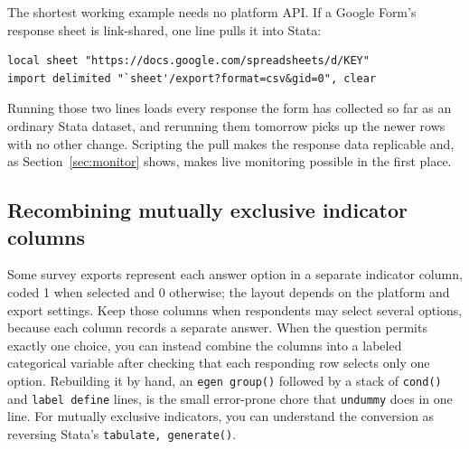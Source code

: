 \documentclass[
    a4paper,
    fontsize=10pt,
    twoside=true,
    numbers=noenddot,
]{kaobook}
\begin{document}
The shortest working example needs no platform API. If a Google Form's response sheet is link-shared, one line pulls it into Stata:
\par
{\footnotesize
\begin{verbatim}
local sheet "https://docs.google.com/spreadsheets/d/KEY"
import delimited "`sheet'/export?format=csv&gid=0", clear
\end{verbatim}
}
Running those two lines loads every response the form has collected so far as an ordinary Stata dataset, and rerunning them tomorrow picks up the newer rows with no other change. Scripting the pull makes the response data replicable and, as Section~\ref{sec:monitor} shows, makes live monitoring possible in the first place.

\subsection{Recombining mutually exclusive indicator columns}
Some survey exports represent each answer option in a separate indicator column, coded 1 when selected and 0 otherwise; the layout depends on the platform and export settings. Keep those columns when respondents may select several options, because each column records a separate answer. When the question permits exactly one choice, you can instead combine the columns into a labeled categorical variable after checking that each responding row selects only one option. Rebuilding it by hand, an \texttt{egen group()} followed by a stack of \texttt{cond()} and \texttt{label define} lines, is the small error-prone chore that \texttt{undummy} does in one line. For mutually exclusive indicators, you can understand the conversion as reversing Stata's \texttt{tabulate, generate()}.
\end{document}
